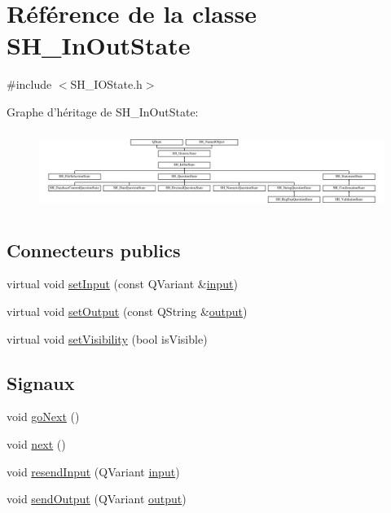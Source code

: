 \hypertarget{classSH__InOutState}{\section{Référence de la classe S\-H\-\_\-\-In\-Out\-State}
\label{classSH__InOutState}
}


{\ttfamily \#include $<$S\-H\-\_\-\-I\-O\-State.\-h$>$}

Graphe d'héritage de S\-H\-\_\-\-In\-Out\-State\-:\begin{figure}[H]
\begin{center}
\leavevmode
\includegraphics[height=2.568807cm]{classSH__InOutState}
\end{center}
\end{figure}
\subsection*{Connecteurs publics}
\begin{DoxyCompactItemize}
\item 
virtual void \hyperlink{classSH__InOutState_aaec9c2b5ef7c406bff7469461352d47c}{set\-Input} (const Q\-Variant \&\hyperlink{classSH__InOutState_a8e1b78069343122df7713624a1a5a100}{input})
\item 
virtual void \hyperlink{classSH__InOutState_af611c84134e262739cd834797b315c80}{set\-Output} (const Q\-String \&\hyperlink{classSH__InOutState_a17ed7eaf5e3ed5af80a4f9fe65d5bfd9}{output})
\item 
virtual void \hyperlink{classSH__InOutState_a7fdfaa6f600f0ac4a96f238a038ba9ad}{set\-Visibility} (bool is\-Visible)
\end{DoxyCompactItemize}
\subsection*{Signaux}
\begin{DoxyCompactItemize}
\item 
void \hyperlink{classSH__GenericState_a34c1bebc765cc3a62d66c94c37d4f0c3}{go\-Next} ()
\item 
void \hyperlink{classSH__GenericState_ad5e2a1f3dc129336c8f529cf897c2eb0}{next} ()
\item 
void \hyperlink{classSH__InOutState_a1f00480afefd173002cf56d4c4128048}{resend\-Input} (Q\-Variant \hyperlink{classSH__InOutState_a8e1b78069343122df7713624a1a5a100}{input})
\item 
void \hyperlink{classSH__InOutState_a77921c5f42059bc97361f4ff7827da12}{send\-Output} (Q\-Variant \hyperlink{classSH__InOutState_a17ed7eaf5e3ed5af80a4f9fe65d5bfd9}{output})
\end{DoxyCompactItemize}
